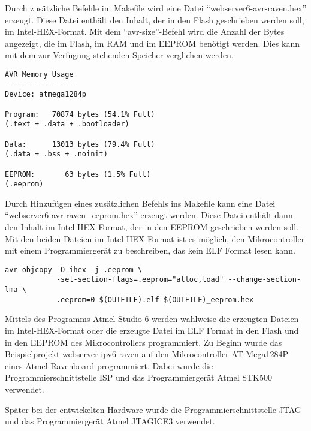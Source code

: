 Durch zusätzliche Befehle im Makefile wird eine Datei "`webserver6-avr-raven.hex"' erzeugt. Diese Datei enthält den Inhalt, der in den Flash geschrieben werden soll, im Intel-HEX-Format. Mit dem "`avr-size"'-Befehl wird die Anzahl der Bytes angezeigt, die im Flash, im RAM und im EEPROM benötigt werden. Dies kann mit dem zur Verfügung stehenden Speicher verglichen werden.

\begin{lstlisting}[caption=Ausgabe vom Befehl "`avr-size"']
AVR Memory Usage
----------------
Device: atmega1284p

Program:   70874 bytes (54.1% Full)
(.text + .data + .bootloader)

Data:      13013 bytes (79.4% Full)
(.data + .bss + .noinit)

EEPROM:       63 bytes (1.5% Full)
(.eeprom)
\end{lstlisting}

Durch Hinzufügen eines zusätzlichen Befehls ins Makefile kann eine Datei "`webserver6-avr-raven\_eeprom.hex"' erzeugt werden. Diese Datei enthält dann den Inhalt im Intel-HEX-Format, der in den EEPROM geschrieben werden soll. Mit den beiden Dateien im Intel-HEX-Format ist es möglich, den Mikrocontroller mit einem Programmiergerät zu beschreiben, das kein ELF Format lesen kann.

\begin{lstlisting}[caption=Befehl um eeprom.hex zu erzeugen]
avr-objcopy -O ihex -j .eeprom \
            -set-section-flags=.eeprom="alloc,load" --change-section-lma \
            .eeprom=0 $(OUTFILE).elf $(OUTFILE)_eeprom.hex
\end{lstlisting}


Mittels des Programms Atmel Studio 6 werden wahlweise die erzeugten Dateien im Intel-HEX-Format oder die erzeugte Datei im ELF Format in den Flash und in den EEPROM des Mikrocontrollers programmiert. Zu Beginn wurde das Beispielprojekt webserver-ipv6-raven auf den Mikrocontroller AT-Mega1284P eines Atmel Ravenboard programmiert. Dabei wurde die Programmierschnittstelle ISP und das Programmiergerät Atmel STK500 verwendet.

Später bei der entwickelten Hardware wurde die Programmierschnittstelle JTAG und das Programmiergerät Atmel JTAGICE3 verwendet.

